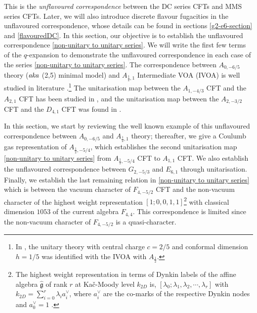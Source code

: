 \documentclass[a4paper,12pt]{article}
\begin{document}
This is the \textit{unflavoured correspondence} between the DC series CFTs and MMS series CFTs. Later, we will also introduce discrete flavour fugacities in the unflavoured correspondence, whose details can be found in sections \ref{g2-e6-section} and \ref{flavouredDC}. In this section, our objective is to establish the unflavoured correspondence \eqref{non-unitary to unitary series}. We will write the first few terms of the $q$-expansion to demonstrate the unflavoured correspondence in each case of the series \eqref{non-unitary to unitary series}. The correspondence between $A_{0,-6/5}$ theory\cite{Beem:2013sza,Beem:2017ooy} (${\it aka}$ (2,5) minimal model) and $A_{\frac{1}{2},1}$ Intermediate VOA (IVOA) is well studied in literature \cite{Mathur:1988gt,Mathur:1988rx,Chandra:2018pjq}.\footnote{In \cite{Kawasetsu_2013}, the unitary theory with central charge $c=2/5$ and conformal dimension $h=1/5$ was identified with the IVOA with $A_{\frac{1}{2}}$.} The unitarisation map between the $A_{1,-4/3}$ CFT and the $A_{2,1}$ CFT has been studied in \cite{Mukhi:1989bp}, and the unitarisation map between the $A_{2,-3/2}$ CFT and the $D_{4,1}$ CFT was found in \cite{Buican:2017rya}.

In this section, we start by reviewing the well known example of this unflavoured correspondence between $A_{0,-6/5}$ and $A_{\frac{1}{2},1}$ theory; thereafter, we give a Coulumb gas representation of $A_{\frac{1}{2},-5/4}$, which establishes the second unitarisation map \eqref{non-unitary to unitary series} from $A_{\frac{1}{2},-5/4}$ CFT to $A_{1,1}$ CFT. We also establish the unflavoured correspondence between $G_{2,-5/3}$ and $E_{6,1}$ through unitarisation. Finally, we establish the last remaining relation in \eqref{non-unitary to unitary series} which is between the vacuum character of $F_{4,-5/2}$ CFT and the non-vacuum character of the highest weight representation $[1;0,0,1,1]$\footnote{The highest weight representation in terms of Dynkin labels of the affine algebra $\hat{\mathfrak{g}}$ of rank $r$ at Ka\v c-Moody level $k_{2D}$ is, $[\lambda_0;\lambda_1,\lambda_2,\cdots,\lambda_r]$ with $k_{2D}=\sum_{i=0}^r\lambda_i a_i^\vee$, where $a_i^\vee$ are the co-marks of the respective Dynkin nodes and $a_0^\vee=1$ \cite{DiFrancesco:1997nk}.} with classical dimension $1053$ of the current algebra $F_{4,4}$. This correspondence is limited since the non-vacuum character of $F_{4,-5/2}$ is a quasi-character.


\end{document}
